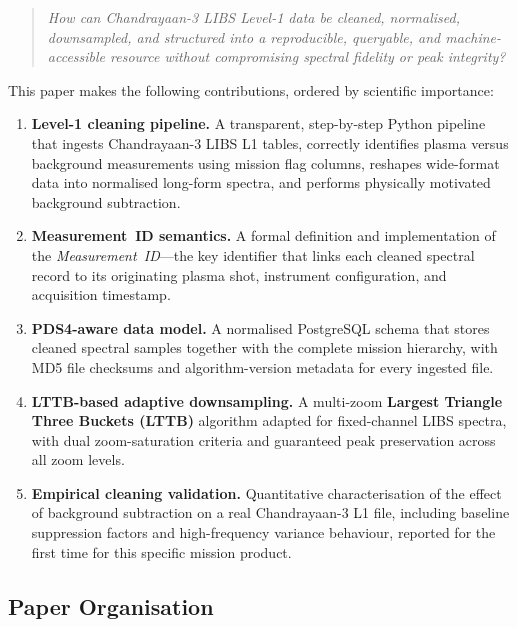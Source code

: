 \documentclass[a4paper,twocolumn,10pt]{article}
\begin{document}
\begin{quote}
\emph{How can Chandrayaan-3 LIBS Level-1 data be cleaned, normalised,
downsampled, and structured into a reproducible, queryable, and
machine-accessible resource without compromising spectral fidelity
or peak integrity?}
\end{quote}

This paper makes the following contributions, ordered by scientific
importance:

\begin{enumerate}[label=\textbf{(C\arabic*)},leftmargin=*,itemsep=3pt]
  \item \textbf{Level-1 cleaning pipeline.}  A transparent,
    step-by-step Python pipeline that ingests Chandrayaan-3 LIBS L1
    tables, correctly identifies plasma versus background measurements
    using mission flag columns, reshapes wide-format data into
    normalised long-form spectra, and performs physically motivated
    background subtraction.

  \item \textbf{Measurement~ID semantics.}  A formal definition and
    implementation of the \emph{Measurement~ID}---the key identifier
    that links each cleaned spectral record to its originating plasma
    shot, instrument configuration, and acquisition timestamp.

  \item \textbf{PDS4-aware data model.}  A normalised PostgreSQL
    schema that stores cleaned spectral samples together with the
    complete mission hierarchy, with MD5 file checksums and
    algorithm-version metadata for every ingested file.

  \item \textbf{LTTB-based adaptive downsampling.}  A multi-zoom
    \textbf{Largest Triangle Three Buckets (LTTB)} algorithm adapted
    for fixed-channel LIBS spectra, with dual zoom-saturation criteria
    and guaranteed peak preservation across all zoom levels.

  \item \textbf{Empirical cleaning validation.}  Quantitative
    characterisation of the effect of background subtraction on a real
    Chandrayaan-3 L1 file, including baseline suppression factors and
    high-frequency variance behaviour, reported for the first time for
    this specific mission product.
\end{enumerate}

\subsection{Paper Organisation}
\end{document}
